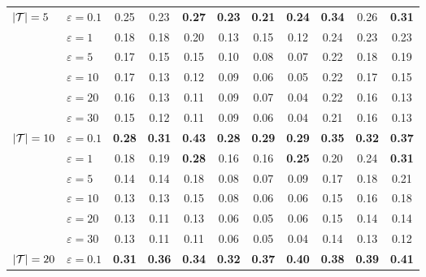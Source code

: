 \begin{table*}[htb]
{\begin{tabular}{llccccccccc}
\midrule
\multirow{6}{*}{$\vert \mathcal{T} \rvert = 5$}  & $\varepsilon = 0.1$ & 0.25    & 0.23   & \textbf{0.27}   & \textbf{0.23}    & \textbf{0.21}    & \textbf{0.24}   & \textbf{0.34}       & 0.26       & \textbf{0.31}      \\
                                & $\varepsilon = 1$   & 0.18    & 0.18   & 0.20   & 0.13    & 0.15    & 0.12   & 0.24       & 0.23       & 0.23      \\
                                & $\varepsilon = 5$   & 0.17    & 0.15   & 0.15   & 0.10    & 0.08    & 0.07   & 0.22       & 0.18       & 0.19      \\
                                & $\varepsilon = 10$  & 0.17    & 0.13   & 0.12  & 0.09    & 0.06    & 0.05   & 0.22       & 0.17       & 0.15      \\
                                & $\varepsilon = 20$  & 0.16    & 0.13   & 0.11   & 0.09    & 0.07    & 0.04   & 0.22       & 0.16       & 0.13      \\
                                & $\varepsilon = 30$  & 0.15    & 0.12   & 0.11   & 0.09    & 0.06    & 0.04   & 0.21       & 0.16       & 0.13      \\
\midrule
\multirow{6}{*}{$\vert \mathcal{T} \rvert = 10$} & $\varepsilon = 0.1$ & \textbf{0.28}    & \textbf{0.31}   & \textbf{0.43}   & \textbf{0.28}    & \textbf{0.29}    & \textbf{0.29}   & \textbf{0.35}       & \textbf{0.32}       & \textbf{0.37}      \\
                                & $\varepsilon = 1$   & 0.18    & 0.19   & \textbf{0.28}   & 0.16    & 0.16    & \textbf{0.25}   & 0.20       & 0.24       & \textbf{0.31}      \\
                                & $\varepsilon = 5$   & 0.14    & 0.14   & 0.18   & 0.08    & 0.07    & 0.09   & 0.17       & 0.18       & 0.21      \\
                                & $\varepsilon = 10$  & 0.13    & 0.13   & 0.15   & 0.08    & 0.06    & 0.06   & 0.15       & 0.16       & 0.18      \\
                                & $\varepsilon = 20$  & 0.13    & 0.11   & 0.13   & 0.06    & 0.05    & 0.06   & 0.15       & 0.14       & 0.14      \\
                                & $\varepsilon = 30$  & 0.13    & 0.11   & 0.11   & 0.06    & 0.05    & 0.04   & 0.14       & 0.13       & 0.12      \\
\midrule
\multirow{6}{*}{$\vert \mathcal{T} \rvert = 20$} & $\varepsilon = 0.1$ & \textbf{0.31}    & \textbf{0.36}   & \textbf{0.34}   & \textbf{0.32}    & \textbf{0.37}    & \textbf{0.40}   & \textbf{0.38}       & \textbf{0.39}       & \textbf{0.41}      \\

\end{tabular}}
\end{table*}
